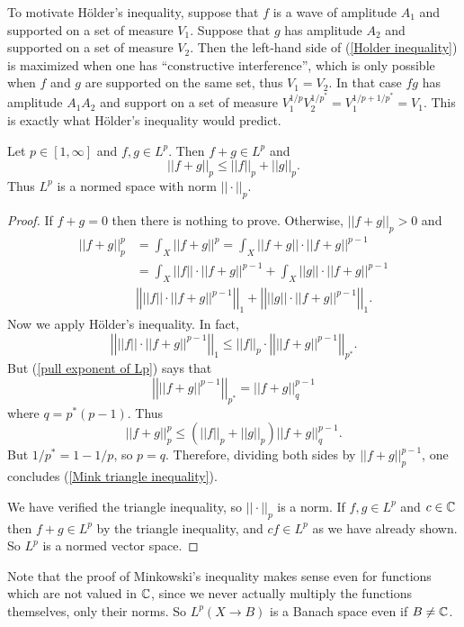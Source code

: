 To motivate H\"older's inequality, suppose that $f$ is a wave of amplitude $A_1$ and supported on a set of measure $V_1$.
Suppose that $g$ has amplitude $A_2$ and supported on a set of measure $V_2$.
Then the left-hand side of (\ref{Holder inequality}) is maximized when one has ``constructive interference'', which is only possible when $f$ and $g$ are supported on the same set, thus $V_1 = V_2$.
In that case $fg$ has amplitude $A_1A_2$ and support on a set of measure $V_1^{1/p}V_2^{1/p^*} = V_1^{1/p+1/p^*} = V_1$.
This is exactly what H\"older's inequality would predict.

\begin{theorem}
Let $p \in [1, \infty]$ and $f, g \in L^p$. Then $f + g \in L^p$ and
\begin{equation}
\label{Mink triangle inequality}
||f + g||_{p}  \leq ||f||_{p}  + ||g||_{p} .
\end{equation}
Thus $L^p$ is a normed space with norm $||\cdot||_{p} $.
\end{theorem}
\begin{proof}
If $f + g = 0$ then there is nothing to prove.
Otherwise, $||f + g||_{p}  > 0$ and
\begin{align*}
||f + g||_{p} ^{p} &= \int_{X} ||f + g||^{p} = \int_{X} ||f + g||\cdot ||f + g||^{p-1} \\
&= \int_{X} ||f||\cdot ||f + g||^{p-1} + \int_{X} ||g||\cdot ||f + g||^{p-1}\\
&\left|\left|||f||\cdot ||f + g||^{p-1}\right|\right|_1 + \left|\left|||g||\cdot ||f + g||^{p-1}\right|\right|_1.
\end{align*}
Now we apply H\"older's inequality. In fact,
\[\left|\left|||f||\cdot ||f + g||^{p-1}\right|\right|_1 \leq ||f||_{p}  \cdot \left|\left|||f + g||^{p-1}\right|\right|_{p^*}.\]
But (\ref{pull exponent of Lp}) says that
\[\left|\left|||f + g||^{p-1}\right|\right|_{p^*} = ||f + g||_q^{p - 1}\]
where $q = p^*(p-1)$. Thus
\[||f + g||_{p} ^{p} \leq (||f||_{p}  + ||g||_{p} ) ||f + g||_q^{p - 1}.\]
But $1/p^* = 1 - 1/p$, so $p = q$. Therefore, dividing both sides by $||f + g||_{p} ^{p - 1}$, one concludes (\ref{Mink triangle inequality}).

We have verified the triangle inequality, so $||\cdot||_{p} $ is a norm. If $f, g \in L^p$ and $c \in \mathbb{C}$ then $f + g \in L^p$ by the triangle inequality, and $cf \in L^p$ as we have already shown.
So $L^p$ is a normed vector space.
\end{proof}
Note that the proof of Minkowski's inequality makes sense even for functions which are not valued in $\mathbb{C}$, since we never actually multiply the functions themselves, only their norms. So $L^p(X \to B)$ is a Banach space even if $B \neq \mathbb{C}$.

